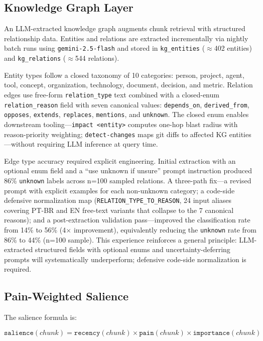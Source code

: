 \documentclass{article}
\begin{document}
\subsection{Knowledge Graph Layer}

An LLM-extracted knowledge graph augments chunk retrieval with structured relationship
data. Entities and relations are extracted incrementally via nightly batch runs using
\texttt{gemini-2.5-flash} and stored in \texttt{kg\_entities} ($\approx$402 entities) and
\texttt{kg\_relations} ($\approx$544 relations).

Entity types follow a closed taxonomy of 10 categories: person, project, agent, tool,
concept, organization, technology, document, decision, and metric. Relation edges use
free-form \texttt{relation\_type} text combined with a closed-enum
\texttt{relation\_reason} field with seven canonical values: \texttt{depends\_on},
\texttt{derived\_from}, \texttt{opposes}, \texttt{extends}, \texttt{replaces},
\texttt{mentions}, and \texttt{unknown}. The closed enum enables downstream tooling---\texttt{impact~\textless entity\textgreater} computes one-hop blast radius with
reason-priority weighting; \texttt{detect-changes} maps git diffs to affected KG
entities---without requiring LLM inference at query time.

Edge type accuracy required explicit engineering. Initial extraction with an optional enum
field and a ``use unknown if unsure'' prompt instruction produced 86\% \texttt{unknown}
labels across n=100 sampled relations. A three-path fix---a revised prompt with explicit
examples for each non-unknown category; a code-side defensive normalization map
(\texttt{RELATION\_TYPE\_TO\_REASON}, 24 input aliases covering PT-BR and EN free-text
variants that collapse to the 7 canonical reasons); and a post-extraction validation
pass---improved the classification rate from 14\% to 56\% (4$\times$ improvement),
equivalently reducing the \texttt{unknown} rate from 86\% to 44\% (n=100 sample). This
experience reinforces a general principle: LLM-extracted structured fields with optional
enums and uncertainty-deferring prompts will systematically underperform; defensive
code-side normalization is required.

\subsection{Pain-Weighted Salience}

The salience formula is:

\begin{equation}
  \texttt{salience}(\mathit{chunk}) =
    \texttt{recency}(\mathit{chunk})
    \times \texttt{pain}(\mathit{chunk})
    \times \texttt{importance}(\mathit{chunk})
  \label{eq:salience}
\end{equation}
\end{document}
